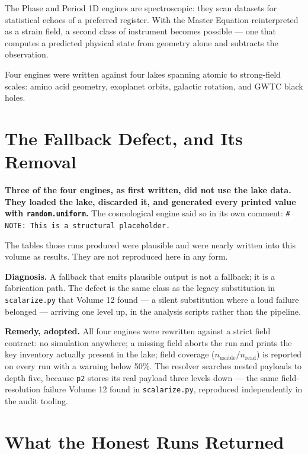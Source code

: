 \documentclass[11pt, letterpaper, openany]{book}
\begin{document}
The Phase and Period 1D engines are spectroscopic: they scan datasets for statistical echoes of a
preferred register. With the Master Equation reinterpreted as a strain field, a second class of
instrument becomes possible --- one that computes a predicted physical state from geometry alone and
subtracts the observation.

Four engines were written against four lakes spanning atomic to strong-field scales: amino acid
geometry, exoplanet orbits, galactic rotation, and GWTC black holes.

\section{The Fallback Defect, and Its Removal}

\begin{correctionbox}
\textbf{Three of the four engines, as first written, did not use the lake data. They loaded the
lake, discarded it, and generated every printed value with \texttt{random.uniform}.} The
cosmological engine said so in its own comment: \texttt{\# NOTE: This is a structural placeholder.}

\medskip
The tables those runs produced were plausible and were nearly written into this volume as results.
They are not reproduced here in any form.

\medskip
\textbf{Diagnosis.} A fallback that emits plausible output is not a fallback; it is a fabrication
path. The defect is the same class as the legacy substitution in \texttt{scalarize.py} that Volume 12
found --- a silent substitution where a loud failure belonged --- arriving one level up, in the
analysis scripts rather than the pipeline.

\medskip
\textbf{Remedy, adopted.} All four engines were rewritten against a strict field contract:
no simulation anywhere; a missing field aborts the run and prints the key inventory actually present
in the lake; field coverage ($n_{\text{usable}}/n_{\text{read}}$) is reported on every run with a
warning below 50\%. The resolver searches nested payloads to depth five, because \texttt{p2} stores
its real payload three levels down --- the same field-resolution failure Volume 12 found in
\texttt{scalarize.py}, reproduced independently in the audit tooling.
\end{correctionbox}

\section{What the Honest Runs Returned}
\end{document}
